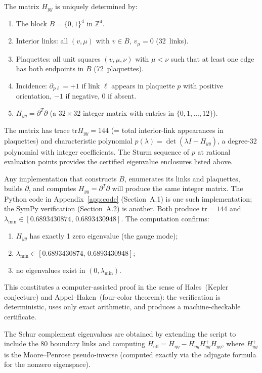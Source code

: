 \documentclass[11pt]{article}
\theoremstyle{definition}
\newcommand{\tr}{\mathrm{tr}}
\newcommand{\Z}{\mathbb{Z}}
\begin{document}
The matrix $H_{yy}$ is uniquely determined by:
\begin{enumerate}[nosep]
\item The block $B=\{0,1\}^4$ in $\Z^4$.
\item Interior links: all $(v,\mu)$ with $v\in B$, $v_\mu=0$
(32~links).
\item Plaquettes: all unit squares $(v,\mu,\nu)$ with
$\mu<\nu$ such that at least one edge has both endpoints
in $B$ (72~plaquettes).
\item Incidence: $\partial_{p\ell}=+1$ if link $\ell$ appears
in plaquette $p$ with positive orientation, $-1$ if negative,
$0$ if absent.
\item $H_{yy}=\partial^T\partial$ (a $32\times 32$ integer
matrix with entries in $\{0,1,\ldots,12\}$).
\end{enumerate}
The matrix has trace $\tr H_{yy}=144$ (= total interior-link
appearances in plaquettes) and characteristic polynomial
$p(\lambda)=\det(\lambda I-H_{yy})$, a degree-32 polynomial
with integer coefficients.  The Sturm sequence of $p$ at
rational evaluation points provides the certified eigenvalue
enclosures listed above.

Any implementation that constructs $B$, enumerates its
links and plaquettes, builds $\partial$, and computes
$H_{yy}=\partial^T\partial$ will produce the same integer
matrix.  The Python code in Appendix~\ref{app:code}
(Section~A.1) is one such implementation; the SymPy
verification (Section~A.2) is another.  Both produce
$\tr=144$ and $\lambda_{\min}\in[0.6893430874,\,0.6893430948]$.  The computation confirms:
\begin{enumerate}[nosep]
\item $H_{yy}$ has exactly 1 zero eigenvalue (the gauge mode);
\item $\lambda_{\min}\in[0.6893430874,\,0.6893430948]$;
\item no eigenvalues exist in $(0,\lambda_{\min})$.
\end{enumerate}
This constitutes a computer-assisted proof in the sense of
Hales~(Kepler conjecture) and Appel--Haken~(four-color theorem):
the verification is deterministic, uses only exact arithmetic, and
produces a machine-checkable certificate.

The Schur complement eigenvalues are obtained by extending the script
to include the 80 boundary links and computing
$H_{\mathrm{eff}}=H_{\eta\eta}-H_{\eta y}H_{yy}^+H_{y\eta}$,
where $H_{yy}^+$ is the Moore--Penrose pseudo-inverse (computed
exactly via the adjugate formula for the nonzero eigenspace).
\end{document}
